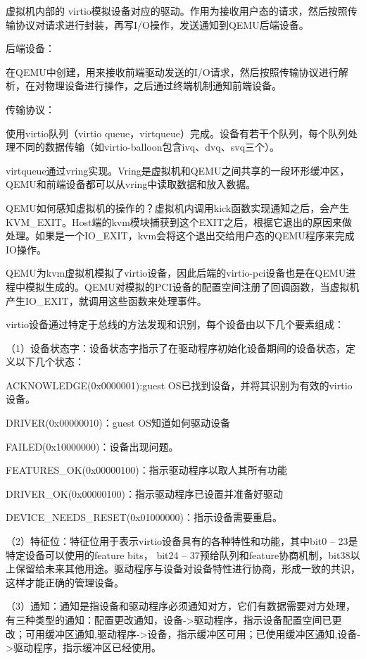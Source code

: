 虚拟机内部的 virtio模拟设备对应的驱动。作用为接收用户态的请求，然后按照传输协议对请求进行封装，再写I/O操作，发送通知到QEMU后端设备。

后端设备：

在QEMU中创建，用来接收前端驱动发送的I/O请求，然后按照传输协议进行解析，在对物理设备进行操作，之后通过终端机制通知前端设备。

传输协议：

使用virtio队列（virtio queue，virtqueue）完成。设备有若干个队列，每个队列处理不同的数据传输（如virtio-balloon包含ivq、dvq、svq三个）。

virtqueue通过vring实现。Vring是虚拟机和QEMU之间共享的一段环形缓冲区，QEMU和前端设备都可以从vring中读取数据和放入数据。

QEMU如何感知虚拟机的操作的？虚拟机内调用kick函数实现通知之后，会产生KVM_EXIT。Host端的kvm模块捕获到这个EXIT之后，根据它退出的原因来做处理。如果是一个IO_EXIT，kvm会将这个退出交给用户态的QEMU程序来完成IO操作。

QEMU为kvm虚拟机模拟了virtio设备，因此后端的virtio-pci设备也是在QEMU进程中模拟生成的。QEMU对模拟的PCI设备的配置空间注册了回调函数，当虚拟机产生IO_EXIT，就调用这些函数来处理事件。

virtio设备通过特定于总线的方法发现和识别，每个设备由以下几个要素组成：

（1）设备状态字：设备状态字指示了在驱动程序初始化设备期间的设备状态，定义以下几个状态：

ACKNOWLEDGE(0x0000001):guest OS已找到设备，并将其识别为有效的virtio设备。

DRIVER(0x00000010)：guest OS知道如何驱动设备

FAILED(0x10000000)：设备出现问题。

FEATURES_OK(0x00000100)：指示驱动程序以取人其所有功能

DRIVER_OK(0x00000100)：指示驱动程序已设置并准备好驱动

DEVICE_NEEDS_RESET(0x01000000)：指示设备需要重启。

（2）特征位：特征位用于表示virtio设备具有的各种特性和功能，其中bit0 – 23是特定设备可以使用的feature bits， bit24 – 37预给队列和feature协商机制，bit38以上保留给未来其他用途。驱动程序与设备对设备特性进行协商，形成一致的共识，这样才能正确的管理设备。

（3）通知：通知是指设备和驱动程序必须通知对方，它们有数据需要对方处理，有三种类型的通知：配置更改通知，设备->驱动程序，指示设备配置空间已更改；可用缓冲区通知,驱动程序->设备，指示缓冲区可用；已使用缓冲区通知,设备->驱动程序，指示缓冲区已经使用。

